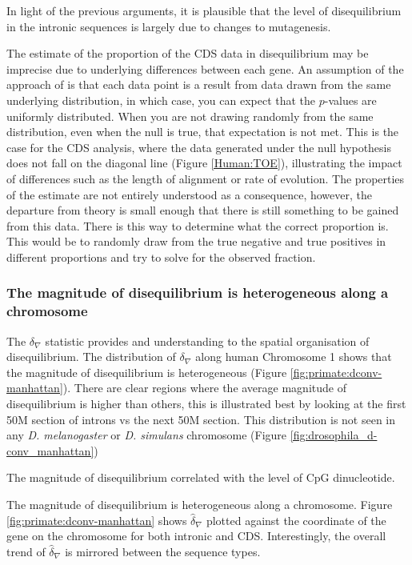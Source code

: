 In light of the previous arguments, it is plausible that the level of disequilibrium in the intronic sequences is largely due to changes to mutagenesis. 

The estimate of the proportion of the CDS data in disequilibrium may be imprecise due to underlying differences between each gene. An assumption of the approach of \cite{Storey2003StatisticalStudies} is that each data point is a result from data drawn from the same underlying distribution, in which case, you can expect that the $p$-values are uniformly distributed. When you are not drawing randomly from the same distribution, even when the null is true, that expectation is not met. This is the case for the CDS analysis, where the data generated under the null hypothesis does not fall on the diagonal line (Figure \ref{Human:TOE}), illustrating the impact of differences such as the length of alignment or rate of evolution. The properties of the estimate are not entirely understood as a consequence, however, the departure from theory is small enough that there is still something to be gained from this data. There is this way to determine what the correct proportion is. This would be to randomly draw from the true negative and true positives in different proportions and try to solve for the observed fraction. 

\subsubsection{The magnitude of disequilibrium is heterogeneous along a chromosome }

The $\delta_\nabla$ statistic provides and understanding to the spatial organisation of disequilibrium. The distribution of $\delta_\nabla$ along human Chromosome 1 shows that the magnitude of disequilibrium is heterogeneous (Figure \ref{fig:primate:dconv-manhattan}). There are clear regions where the average magnitude of disequilibrium is higher than others, this is illustrated best by looking at the first 50M section of introns vs the next 50M section. This distribution is not seen in any \textit{D. melanogaster} or \textit{D. simulans} chromosome (Figure \ref{fig:drosophila_d-conv_manhattan})


The magnitude of disequilibrium correlated with the level of CpG dinucleotide. 


The magnitude of disequilibrium is heterogeneous along a chromosome. Figure \ref{fig:primate:dconv-manhattan} shows $\hat \delta_\nabla$ plotted against the coordinate of the gene on the chromosome for both intronic and CDS.  Interestingly, the overall trend of $\hat \delta_\nabla$ is mirrored between the sequence types. 



